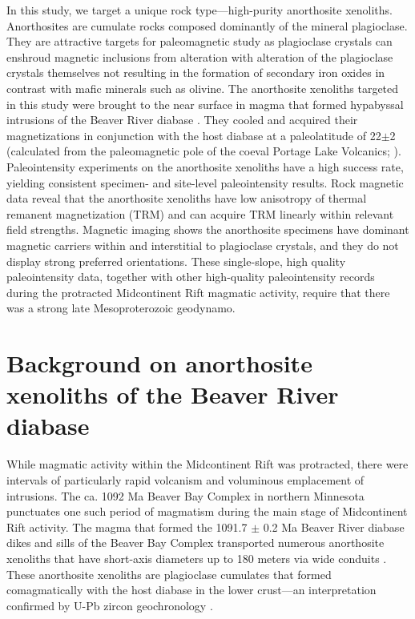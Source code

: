 \documentclass[9pt,twocolumn,twoside,lineno]{pnas-new}
\begin{document}
In this study, we target a unique rock type---high-purity anorthosite xenoliths. Anorthosites are cumulate rocks composed dominantly of the mineral plagioclase. They are attractive targets for paleomagnetic study as plagioclase crystals can enshroud magnetic inclusions from alteration with alteration of the plagioclase crystals themselves not resulting in the formation of secondary iron oxides in contrast with mafic minerals such as olivine. The anorthosite xenoliths targeted in this study were brought to the near surface in magma that formed hypabyssal intrusions of the Beaver River diabase \cite{Zhang2021b}. They cooled and acquired their magnetizations in conjunction with the host diabase at a paleolatitude of 22\textdegree $\pm$2 \textdegree (calculated from the paleomagnetic pole of the coeval Portage Lake Volcanics; \citealp{Swanson-Hysell2019a, Zhang2021b}). Paleointensity experiments on the anorthosite xenoliths have a high success rate, yielding consistent specimen- and site-level paleointensity results. Rock magnetic data reveal that the anorthosite xenoliths have low anisotropy of thermal remanent magnetization (TRM) and can acquire TRM linearly within relevant field strengths. Magnetic imaging shows the anorthosite specimens have dominant magnetic carriers within and interstitial to plagioclase crystals, and they do not display strong preferred orientations. These single-slope, high quality paleointensity data, together with other high-quality paleointensity records during the protracted Midcontinent Rift magmatic activity, require that there was a strong late Mesoproterozoic geodynamo.

\section*{Background on anorthosite xenoliths of the Beaver River diabase}

While magmatic activity within the Midcontinent Rift was protracted, there were intervals of particularly rapid volcanism and voluminous emplacement of intrusions. The ca. 1092 Ma Beaver Bay Complex in northern Minnesota punctuates one such period of magmatism during the main stage of Midcontinent Rift activity. The magma that formed the 1091.7 $\pm$ 0.2 Ma Beaver River diabase dikes and sills of the Beaver Bay Complex transported numerous anorthosite xenoliths that have short-axis diameters up to 180 meters via wide conduits \cite{Boerboom2004a, Boerboom2006b}. These anorthosite xenoliths are plagioclase cumulates that formed comagmatically with the host diabase in the lower crust---an interpretation confirmed by U-Pb zircon geochronology \cite{Zhang2021b}. 
\end{document}
